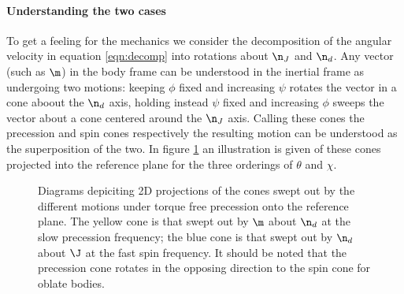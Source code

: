 \documentclass[/home/greg/Thesis/main/main.tex]{subfiles}
\begin{document}
\paragraph{Understanding the two cases}
To get a feeling for the mechanics we consider the decomposition of the angular velocity in equation \ref{eqn:decomp} into rotations about $\n_{J}$ and $\n_{d}$. Any vector (such as $\m$) in the body frame can be understood in the inertial frame as undergoing two motions: keeping $\phi$ fixed and increasing $\psi$ rotates the vector in a cone aboout the $\n_{d}$ axis, holding instead $\psi$ fixed and increasing $\phi$ sweeps the vector about a cone centered around the $\n_{J}$ axis.  Calling these cones the precession and spin cones respectively the resulting motion can be understood as the superposition of the two.  In figure \ref{fig:cones} an illustration is given of these cones projected into the reference plane for the three orderings of $\theta$ and $\chi$.  
\begin{figure}[ht]
\centering
\caption{Diagrams depiciting 2D projections of the cones swept out by the different motions under torque free precession onto the reference plane. The yellow cone is that swept out by $\m$ about $\n_{d}$ at the slow precession frequency; the blue cone is that swept out by $\n_{d}$ about $\J$ at the fast spin frequency. It should be noted that the precession cone rotates in the opposing direction to the spin cone for oblate bodies. }
\label{fig:cones}
\end{figure}
\end{document}
